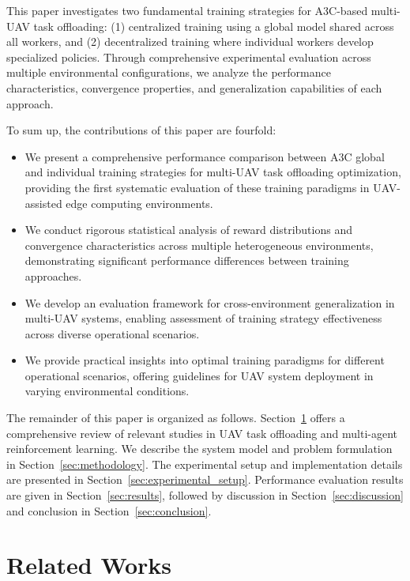 \documentclass[journal]{IEEEtran}
\begin{document}
This paper investigates two fundamental training strategies for A3C-based multi-UAV task offloading: (1) centralized training using a global model shared across all workers, and (2) decentralized training where individual workers develop specialized policies. Through comprehensive experimental evaluation across multiple environmental configurations, we analyze the performance characteristics, convergence properties, and generalization capabilities of each approach.

To sum up, the contributions of this paper are fourfold: 
\begin{itemize}
    \item We present a comprehensive performance comparison between A3C global and individual training strategies for multi-UAV task offloading optimization, providing the first systematic evaluation of these training paradigms in UAV-assisted edge computing environments.
    \item We conduct rigorous statistical analysis of reward distributions and convergence characteristics across multiple heterogeneous environments, demonstrating significant performance differences between training approaches.
    \item We develop an evaluation framework for cross-environment generalization in multi-UAV systems, enabling assessment of training strategy effectiveness across diverse operational scenarios.
    \item We provide practical insights into optimal training paradigms for different operational scenarios, offering guidelines for UAV system deployment in varying environmental conditions.
\end{itemize}

The remainder of this paper is organized as follows. Section~\ref{sec:related_work} offers a comprehensive review of relevant studies in UAV task offloading and multi-agent reinforcement learning. We describe the system model and problem formulation in Section~\ref{sec:methodology}. The experimental setup and implementation details are presented in Section~\ref{sec:experimental_setup}. Performance evaluation results are given in Section~\ref{sec:results}, followed by discussion in Section~\ref{sec:discussion} and conclusion in Section~\ref{sec:conclusion}.

\section{Related Works}
\label{sec:related_work}
\end{document}
